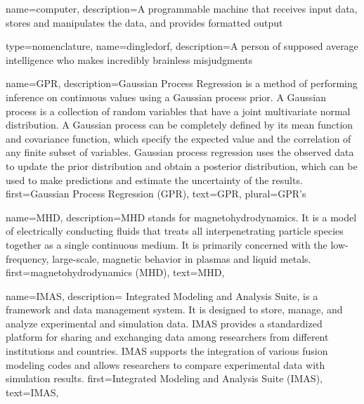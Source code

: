 {
name=computer,
description={A programmable machine that receives input data,
               stores and manipulates the data, and provides
               formatted output}
}

{
type=nomenclature,
name=dingledorf,
description={A person of supposed average intelligence who makes incredibly brainless misjudgments}
}



{%
  name={GPR},%
  description={Gaussian Process Regression is a method of performing inference on continuous values using a Gaussian process prior. A Gaussian process is a collection of random variables that have a joint multivariate normal distribution. A Gaussian process can be completely defined by its mean function and covariance function, which specify the expected value and the correlation of any finite subset of variables. Gaussian process regression uses the observed data to update the prior distribution and obtain a posterior distribution, which can be used to make predictions and estimate the uncertainty of the results.}
  first={Gaussian Process Regression (GPR)},%
  text={GPR},%
  plural={GPR's}%
}

{%
  name={MHD},%
  description={MHD stands for magnetohydrodynamics. It is a model of electrically conducting fluids that treats all interpenetrating particle species together as a single continuous medium. It is primarily concerned with the low-frequency, large-scale, magnetic behavior in plasmas and liquid metals.}
  first={magnetohydrodynamics (MHD)},%
  text={MHD},%
}

{%
  name={IMAS},%
  description={ Integrated Modeling and Analysis Suite, is a framework and data management system. It is designed to store, manage, and analyze experimental and simulation data. IMAS provides a standardized platform for sharing and exchanging data among researchers from different institutions and countries. IMAS supports the integration of various fusion modeling codes and allows researchers to compare experimental data with simulation results.}
  first={Integrated Modeling and Analysis Suite (IMAS)},%
  text={IMAS},%
}


